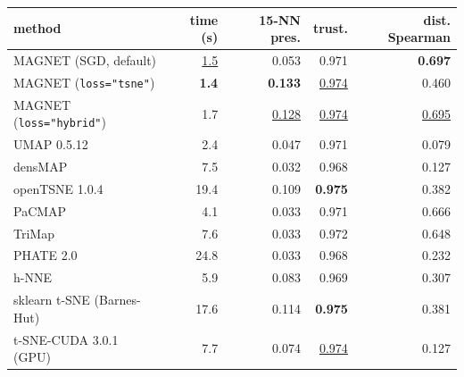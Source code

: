 \begin{tabular}{lrrrr}
\toprule
method & time (s) & 15-NN pres. & trust. & dist. Spearman \\
\midrule
MAGNET (SGD, default) & \underline{1.5} & 0.053 & 0.971 & \textbf{0.697} \\
MAGNET (\texttt{loss="tsne"}) & \textbf{1.4} & \textbf{0.133} & \underline{0.974} & 0.460 \\
MAGNET (\texttt{loss="hybrid"}) & 1.7 & \underline{0.128} & \underline{0.974} & \underline{0.695} \\
UMAP 0.5.12 & 2.4 & 0.047 & 0.971 & 0.079 \\
densMAP  & 7.5 & 0.032 & 0.968 & 0.127 \\
openTSNE 1.0.4 & 19.4 & 0.109 & \textbf{0.975} & 0.382 \\
PaCMAP & 4.1 & 0.033 & 0.971 & 0.666 \\
TriMap & 7.6 & 0.033 & 0.972 & 0.648 \\
PHATE 2.0 & 24.8 & 0.033 & 0.968 & 0.232 \\
h-NNE & 5.9 & 0.083 & 0.969 & 0.307 \\
sklearn t-SNE (Barnes-Hut) & 17.6 & 0.114 & \textbf{0.975} & 0.381 \\
t-SNE-CUDA 3.0.1 (GPU) & 7.7 & 0.074 & \underline{0.974} & 0.127 \\
\bottomrule
\end{tabular}
